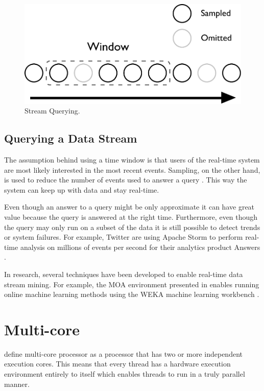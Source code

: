 \begin{figure}[!htb]
	\centering
	\includegraphics[scale=0.5]{pdf/stream.pdf}
	\caption{Stream Querying.}
	\label{fig:stream}
\end{figure}

\subsection{Querying a Data Stream}

The assumption behind using a time window is that users of the real-time system are most likely interested in the most recent events. Sampling, on the other hand, is used to reduce the number of events used to answer a query \citep{Gaber:2005:MDS:1083784.1083789}. This way the system can keep up with data and stay real-time.

Even though an answer to a query might be only approximate it can have great value because the query is answered at the right time. Furthermore, even though the query may only run on a subset of the data it is still possible to detect trends or system failures. For example, Twitter are using Apache Storm to perform real-time analysis on millions of events per second for their analytics product Answers \citep{Solovey}.

In research, several techniques have been developed to enable real-time data stream mining. For example, the MOA environment presented in \cite{Bifet:2010:MMO:1756006.1859903} enables running online machine learning methods using the WEKA machine learning workbench \citep{Holmes1994}.


\section{Multi-core}
\label{sec:multicore}

\textcite{akhter2006multi} define multi-core processor as a processor that has two or more independent execution cores. This means that every thread has a hardware execution environment entirely to itself which enables threads to run in a truly parallel manner.

